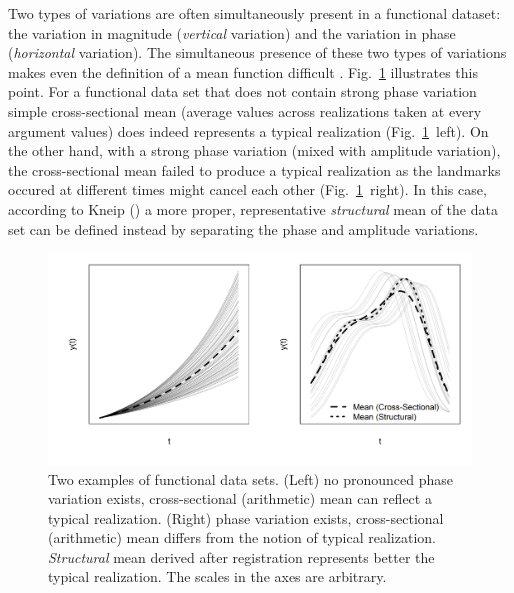 Two types of variations are often simultaneously present in a functional dataset: the variation in magnitude (\emph{vertical} variation) and the variation in phase (\emph{horizontal} variation).
The simultaneous presence of these two types of variations makes even the definition of a mean function difficult \cite{Kneip1992}.
Fig.~\ref{fig:illustrate_phase_variation} illustrates this point.
For a functional data set that does not contain strong phase variation simple cross-sectional mean (average values across realizations taken at every argument values) does indeed represents a typical realization (Fig.~\ref{fig:illustrate_phase_variation}~left).
On the other hand, with a strong phase variation (mixed with amplitude variation), the cross-sectional mean failed to produce a typical realization as the landmarks occured at different times might cancel each other (Fig.~\ref{fig:illustrate_phase_variation}~right).
In this case, according to Kneip (\cite{Kneip1992}) a more proper, representative \emph{structural} mean of the data set can be defined instead by separating the phase and amplitude variations.
\begin{figure}[bth]
	\centering
	\includegraphics[scale=0.48,trim={0 1cm 0 0},clip]{../figures/r-figures/illustratePhaseVariation.png}
	\caption[Variation in functional data sets, with and without phase variation]{Two examples of functional data sets. (Left) no pronounced phase variation exists, cross-sectional (arithmetic) mean can reflect a typical realization. (Right) phase variation exists, cross-sectional (arithmetic) mean differs from the notion of typical realization. \emph{Structural} mean derived after registration represents better the typical realization. The scales in the axes are arbitrary.}
	\label{fig:illustrate_phase_variation}
\end{figure}

